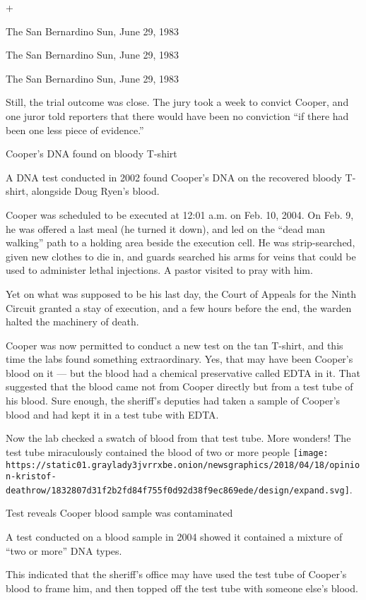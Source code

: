 +

The San Bernardino Sun, June 29, 1983

The San Bernardino Sun, June 29, 1983

The San Bernardino Sun, June 29, 1983

Still, the trial outcome was close. The jury took a week to convict
Cooper, and one juror told reporters that there would have been no
conviction ``if there had been one less piece of evidence.''

Cooper's DNA found on bloody T-shirt

A DNA test conducted in 2002 found Cooper's DNA on the recovered bloody
T-shirt, alongside Doug Ryen's blood.

Cooper was scheduled to be executed at 12:01 a.m. on Feb. 10, 2004. On
Feb. 9, he was offered a last meal (he turned it down), and led on the
``dead man walking'' path to a holding area beside the execution cell.
He was strip-searched, given new clothes to die in, and guards searched
his arms for veins that could be used to administer lethal injections. A
pastor visited to pray with him.

Yet on what was supposed to be his last day, the Court of Appeals for
the Ninth Circuit granted a stay of execution, and a few hours before
the end, the warden halted the machinery of death.

Cooper was now permitted to conduct a new test on the tan T-shirt, and
this time the labs found something extraordinary. Yes, that may have
been Cooper's blood on it --- but the blood had a chemical preservative
called EDTA in it. That suggested that the blood came not from Cooper
directly but from a test tube of his blood. Sure enough, the sheriff's
deputies had taken a sample of Cooper's blood and had kept it in a test
tube with EDTA.

Now the lab checked a swatch of blood from that test tube. More wonders!
The test tube miraculously contained the blood of two or more people
\texttt{[image: https://static01.graylady3jvrrxbe.onion/newsgraphics/2018/04/18/opinion-kristof-deathrow/1832807d31f2b2fd84f755f0d92d38f9ec869ede/design/expand.svg]}.

Test reveals Cooper blood sample was contaminated

A test conducted on a blood sample in 2004 showed it contained a mixture
of ``two or more'' DNA types.

This indicated that the sheriff's office may have used the test tube of
Cooper's blood to frame him, and then topped off the test tube with
someone else's blood.

